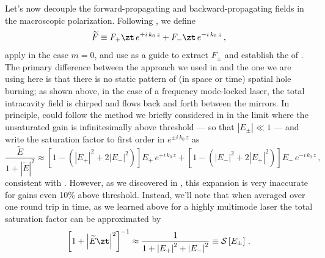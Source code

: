 Let's now decouple the forward-propagating and backward-propagating fields in the macroscopic polarization. Following , we define
\begin{equation}
    \widetilde{F} \equiv F_+\zt\, e^{+ i\, k_0\, z} + F_-\zt\, e^{- i\, k_0\, z}\, ,
\end{equation}
apply  in the case $m = 0$, and use  as a guide to extract $F_\pm$ and establish the \rhs of . The primary difference between the approach we used in  and the one we are using here is that there is no static pattern of (in space or time) spatial hole burning; as shown above, in the case of a frequency mode-locked laser, the total intracavity field is chirped and flows back and forth between the mirrors. In principle, could follow the method we briefly considered in  in the limit where the unsaturated gain is infinitesimally above threshold --- so that $\left|E_\pm\right| \ll 1$ --- and write the saturation factor to first order in $e^{\pm i\, k_0\, z}$ as
\begin{equation}
    \frac{\widetilde{E}}{1 + \left|\widetilde{E}\right|^2} \approx \left[1 - \left(\left|E_+\right|^2 + 2 \left|E_-\right|^2\right)\right] E_+\, e^{+ i\, k_0\, z} + \left[1 - \left(\left|E_-\right|^2 + 2 \left|E_+\right|^2\right)\right] E_-\, e^{- i\, k_0\, z}\, ,
\end{equation}
consistent with . However, as we discovered in , this expansion is very inaccurate for gains even 10\% above threshold. Instead, we'll note that when averaged over one round trip in time, as we learned above for a highly multimode laser the total saturation factor can be approximated by
\begin{equation} \label{eqn:mflt_shb_sat_approx}
    \left[1 + \left|\widetilde{E}\zt\right|^2\right]^{-1}  \approx \frac{1}{1 + \left|E_+\right|^2 + \left|E_-\right|^2} \equiv \mathcal{S}\left[E_\pm\right]\, .
\end{equation}

